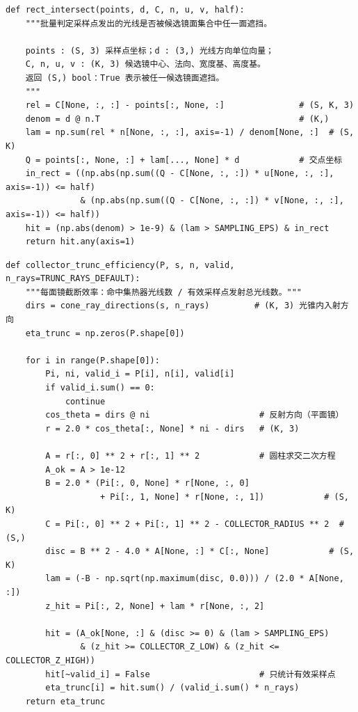 \documentclass[12pt,a4paper,fontset=fandol]{ctexart}
\begin{document}
\begin{lstlisting}[caption={阴影遮挡判定：射线-矩形求交（q1\_functions.py）}, label={code:ray_rect}]
def rect_intersect(points, d, C, n, u, v, half):
    """批量判定采样点发出的光线是否被候选镜面集合中任一面遮挡。

    points : (S, 3) 采样点坐标；d : (3,) 光线方向单位向量；
    C, n, u, v : (K, 3) 候选镜中心、法向、宽度基、高度基。
    返回 (S,) bool：True 表示被任一候选镜面遮挡。
    """
    rel = C[None, :, :] - points[:, None, :]               # (S, K, 3)
    denom = d @ n.T                                        # (K,)
    lam = np.sum(rel * n[None, :, :], axis=-1) / denom[None, :]  # (S, K)
    Q = points[:, None, :] + lam[..., None] * d            # 交点坐标
    in_rect = ((np.abs(np.sum((Q - C[None, :, :]) * u[None, :, :], axis=-1)) <= half)
               & (np.abs(np.sum((Q - C[None, :, :]) * v[None, :, :], axis=-1)) <= half))
    hit = (np.abs(denom) > 1e-9) & (lam > SAMPLING_EPS) & in_rect
    return hit.any(axis=1)
\end{lstlisting}

\begin{lstlisting}[caption={截断效率：Sobol 光锥采样与射线-圆柱求交（q1\_functions.py）}, label={code:ray_cyl}]
def collector_trunc_efficiency(P, s, n, valid, n_rays=TRUNC_RAYS_DEFAULT):
    """每面镜截断效率：命中集热器光线数 / 有效采样点发射总光线数。"""
    dirs = cone_ray_directions(s, n_rays)         # (K, 3) 光锥内入射方向
    eta_trunc = np.zeros(P.shape[0])

    for i in range(P.shape[0]):
        Pi, ni, valid_i = P[i], n[i], valid[i]
        if valid_i.sum() == 0:
            continue
        cos_theta = dirs @ ni                      # 反射方向（平面镜）
        r = 2.0 * cos_theta[:, None] * ni - dirs   # (K, 3)

        A = r[:, 0] ** 2 + r[:, 1] ** 2            # 圆柱求交二次方程
        A_ok = A > 1e-12
        B = 2.0 * (Pi[:, 0, None] * r[None, :, 0]
                   + Pi[:, 1, None] * r[None, :, 1])            # (S, K)
        C = Pi[:, 0] ** 2 + Pi[:, 1] ** 2 - COLLECTOR_RADIUS ** 2  # (S,)
        disc = B ** 2 - 4.0 * A[None, :] * C[:, None]            # (S, K)
        lam = (-B - np.sqrt(np.maximum(disc, 0.0))) / (2.0 * A[None, :])
        z_hit = Pi[:, 2, None] + lam * r[None, :, 2]

        hit = (A_ok[None, :] & (disc >= 0) & (lam > SAMPLING_EPS)
               & (z_hit >= COLLECTOR_Z_LOW) & (z_hit <= COLLECTOR_Z_HIGH))
        hit[~valid_i] = False                      # 只统计有效采样点
        eta_trunc[i] = hit.sum() / (valid_i.sum() * n_rays)
    return eta_trunc
\end{lstlisting}
\end{document}
